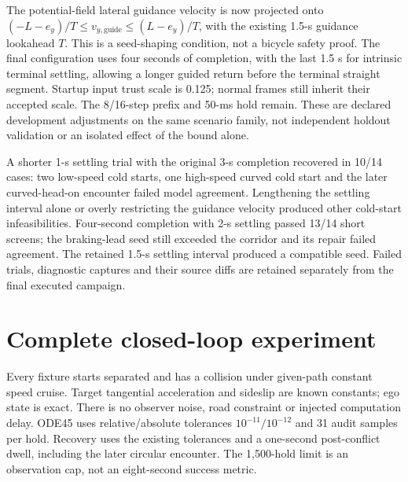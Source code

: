 \documentclass[10pt]{article}
\begin{document}
The potential-field lateral guidance velocity is now projected onto
$(-L-e_y)/T\le v_{y,\mathrm{guide}}\le(L-e_y)/T$, with the existing 1.5-s guidance
lookahead $T$. This is a seed-shaping condition, not a bicycle safety proof.
The final configuration uses four seconds of completion, with the last 1.5 s
for intrinsic terminal settling, allowing a longer guided return before the
terminal straight segment. Startup input trust scale is 0.125; normal frames
still inherit their accepted scale. The 8/16-step prefix and 50-ms hold remain.
These are declared development adjustments on the same scenario family,
not independent holdout validation or an isolated effect of the bound alone.

A shorter 1-s settling trial with the original 3-s completion recovered in
10/14 cases: two low-speed cold starts, one high-speed curved cold start and
the later curved-head-on encounter failed model agreement. Lengthening the
settling interval alone or overly restricting the guidance velocity produced
other cold-start infeasibilities. Four-second completion with 2-s settling
passed 13/14 short screens; the braking-lead seed still exceeded the corridor
and its repair failed agreement. The retained 1.5-s settling interval produced
a compatible seed. Failed trials, diagnostic captures and their source diffs
are retained separately from the final executed campaign.

\section{Complete closed-loop experiment}
Every fixture starts separated and has a collision under given-path constant
speed cruise. Target tangential acceleration and sideslip are known constants;
ego state is exact. There is no observer noise, road constraint or injected
computation delay. ODE45 uses relative/absolute tolerances $10^{-11}/10^{-12}$
and 31 audit samples per hold. Recovery uses the existing tolerances and a
one-second post-conflict dwell, including the later circular encounter. The
1,500-hold limit is an observation cap, not an eight-second success metric.
\end{document}
